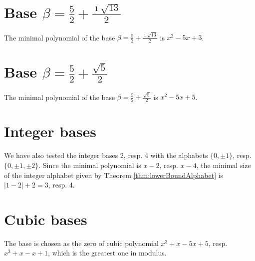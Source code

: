 \section{\texorpdfstring{Base $\beta = \frac{5}{2} + \frac{\imath \sqrt{13}}{2}$}{Base beta = {5}/{2} + i sqrt(13)/2}}
The minimal polynomial of the base $\beta = \frac{5}{2} + \frac{\imath \sqrt{13}}{2}$ is $x^2 -5x+3$.


\section{\texorpdfstring{Base $\beta = \frac{5}{2} + \frac{\sqrt{5}}{2}$}{Base beta = {5}/{2} + sqrt(5)/{2}}}
The minimal polynomial of the base $\beta = \frac{5}{2} + \frac{\sqrt{5}}{2}$ is $x^2 -5x+5$.


\section{Integer bases}
We have also tested the integer bases 2, resp. 4 with the alphabets $\{0,\pm 1\}$, resp. $\{0,\pm 1, \pm 2\}$. Since the minimal polynomial is $x-2$, resp. $x-4$, the minimal size of the integer alphabet given by Theorem \ref{thm:lowerBoundAlphabet} is $|1-2|+2=3$, resp. 4. 



\section{Cubic bases}
The base is chosen as the zero of cubic polynomial $x^3+x-5x+5$, resp. $x^3+x-x+1$, which is the greatest one in modulus. 

